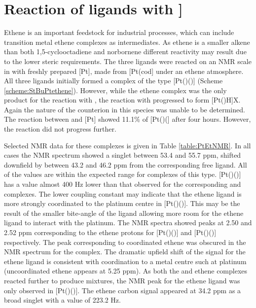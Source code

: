 \section{Reaction of \tBuxantphos{} ligands with \texorpdfstring{\ce{[Pt(C2H4)3}]} P}

Ethene is an important feedstock for industrial processes, which can include transition metal ethene complexes as intermediates.\cite{Yoneda2001, Degnan2001}  As ethene is a smaller alkene than both 1,5-cyclooctadiene and norbornene different reactivity may result due to the lower steric requirements.  The three \tBuxantphos{} ligands were reacted on an NMR scale in  with freshly prepared [Pt], made from [Pt(cod] under an ethene atmosphere.  All three ligands initially formed a complex of the type [Pt(\tBuxantphos{})()] (Scheme \ref{scheme:StBuPtethene}).  However, while the ethene complex was the only product for the reaction with \tButhixantphos, the reaction with \tBuxantphos{} progressed to form [Pt(\tBuxantphos)H]X.  Again the nature of the counterion in this species was unable to be determined.  The reaction between \tBusixantphos and [Pt] showed 11.1\% of [Pt(\tBusixantphos)(] after four hours.  However, the reaction did not progress further.  

Selected NMR data for these complexes is given in Table \ref{table:PtEtNMR}.  In all cases the \phosphorus{} NMR spectrum showed a singlet between 53.4 and 55.7 ppm, shifted downfield by between 43.2 and 46.2 ppm from the corresponding free ligand.  All of the \JPtP{} values are within the expected range for complexes of this type.\cite{Pregosin2012}  [Pt(\tBusixantphos{})()] has a \JPtP{} value almost 400 Hz lower than that observed for the corresponding \tButhixantphos{} and \tBuxantphos{} complexes.    The lower coupling constant may indicate that the ethene ligand is more strongly coordinated to the platinum centre in [Pt(\tBusixantphos{})()].  This may be the result of the smaller bite-angle of the \tBusixantphos{} ligand allowing more room for the ethene ligand to interact with the platinum.  The \proton{} NMR spectra showed peaks at 2.50 and 2.52 ppm corresponding to the ethene protons for [Pt(\tButhixantphos{})()] and [Pt(\tBuxantphos{})()] respectively.   The peak corresponding to coordinated ethene was obscured in the \proton{} NMR spectrum for the \tBusixantphos{} complex.  The dramatic upfield shift of the \proton{} signal for the ethene ligand is consistent with coordination to a metal centre such at platinum (uncoordinated ethene appears at 5.25 ppm\cite{Fulmer2010}).  As both the \tBusixantphos{} and \tBuxantphos{} ethene complexes reacted further to produce mixtures, the \carbon{} NMR peak for the ethene ligand was only observed in [Pt(\tButhixantphos{})()].  The ethene carbon signal appeared at 34.2 ppm as a broad singlet with a \JPtC{} value of 223.2 Hz.

